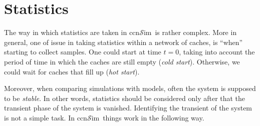 \documentclass{book}
\newcommand{\ccnsim}{ccn$\mathcal{S}$im}
\begin{document}
\section{Statistics}
The way in which statistics are taken in \ccnsim\ is rather complex. More in general, one of  issue in taking statistics within a network of caches, is ``when'' starting to collect samples. One could start at time $t = 0$, taking  into account the period of time in which the caches are still empty (\emph{cold start}). Otherwise, we could wait for caches that fill up (\emph{hot start}). 

Moreover, when comparing simulations with models, often the system is supposed to be \emph{stable}. In other words, statistics should be considered only after that the transient phase of the system is vanished. Identifying the transient of the system is not a simple task. In \ccnsim\ things work in the following way. 
\end{document}
